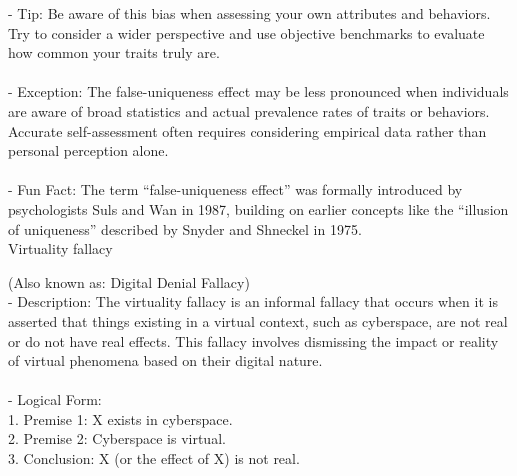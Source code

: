 \documentclass[a4paper,12pt,single,pdftex]{scrartcl}
\begin{document}
    
      - Tip: Be aware of this bias when assessing your own attributes and behaviors. Try to consider a wider perspective and use objective benchmarks to evaluate how common your traits truly are.
    \\

    
      
    \\

    
      - Exception: The false-uniqueness effect may be less pronounced when individuals are aware of broad statistics and actual prevalence rates of traits or behaviors. Accurate self-assessment often requires considering empirical data rather than personal perception alone.
    \\

    
      
    \\

    
      - Fun Fact: The term “false-uniqueness effect” was formally introduced by psychologists Suls and Wan in 1987, building on earlier concepts like the “illusion of uniqueness” described by Snyder and Shneckel in 1975.
    \\

  

Virtuality fallacy
    
      (Also known as: Digital Denial Fallacy)
    \\

  
    
      - Description: The virtuality fallacy is an informal fallacy that occurs when it is asserted that things existing in a virtual context, such as cyberspace, are not real or do not have real effects. This fallacy involves dismissing the impact or reality of virtual phenomena based on their digital nature.
    \\

    
      
    \\

    
      - Logical Form:
    \\

    
        1. Premise 1: X exists in cyberspace.
    \\

    
        2. Premise 2: Cyberspace is virtual.
    \\

    
        3. Conclusion: X (or the effect of X) is not real.
    \\
\end{document}
